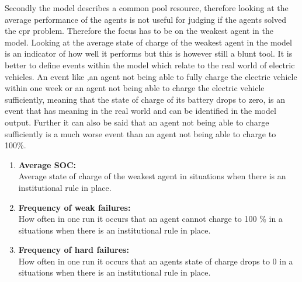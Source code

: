 \documentclass[a4paper]{article}
\begin{document}
Secondly the model describes a common pool resource, therefore looking at the average performance of the agents 
is not useful for judging if the agents solved the cpr problem. Therefore the focus has to be on the weakest agent 
in the model. Looking at the average state of charge of the weakest agent in the model is an indicator of 
how well it performs but this is however still a blunt tool. It is better to define events within the model which relate 
to the real world of electric vehicles. An event like ,an agent not being able to fully charge the electric vehicle 
within one week or an agent not being able to charge the electric vehicle sufficiently, 
meaning that the state of charge of its battery drops to zero, is an event that has meaning in the real world and can 
be identified in the model output. Further it can also be said that an agent not being able to charge sufficiently is a
much worse event than an agent not being able to charge to 100\%.
\begin{enumerate}
 \item \textbf{Average SOC:}\\
 Average state of charge of the weakest agent in situations when there is an institutional rule in place.
 \item \textbf{Frequency of weak failures:}\\
 How often in one run it occurs that 
 an agent cannot charge to 100 \% in a situations when there is an institutional rule in place.
 \item \textbf{Frequency of hard failures:}\\
 How often in one run it occurs that 
 an agents state of charge drops to 0 in a situations when there is an institutional rule in place.
\end{enumerate}
\end{document}
